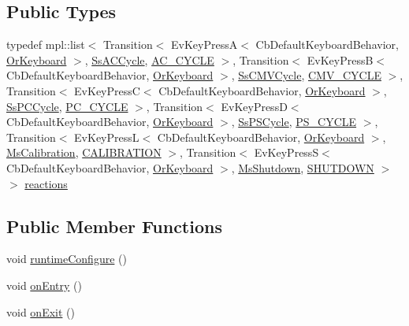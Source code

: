 \subsection*{Public Types}
\begin{DoxyCompactItemize}
\item 
typedef mpl\+::list$<$ Transition$<$ Ev\+Key\+PressA$<$ Cb\+Default\+Keyboard\+Behavior, \hyperlink{classsm__respira__1_1_1OrKeyboard}{Or\+Keyboard} $>$, \hyperlink{structsm__respira__1_1_1SsACCycle}{Ss\+A\+C\+Cycle}, \hyperlink{structsm__respira__1_1_1StObserve_1_1AC__CYCLE}{A\+C\+\_\+\+C\+Y\+C\+LE} $>$, Transition$<$ Ev\+Key\+PressB$<$ Cb\+Default\+Keyboard\+Behavior, \hyperlink{classsm__respira__1_1_1OrKeyboard}{Or\+Keyboard} $>$, \hyperlink{structsm__respira__1_1_1SsCMVCycle}{Ss\+C\+M\+V\+Cycle}, \hyperlink{structsm__respira__1_1_1StObserve_1_1CMV__CYCLE}{C\+M\+V\+\_\+\+C\+Y\+C\+LE} $>$, Transition$<$ Ev\+Key\+PressC$<$ Cb\+Default\+Keyboard\+Behavior, \hyperlink{classsm__respira__1_1_1OrKeyboard}{Or\+Keyboard} $>$, \hyperlink{structsm__respira__1_1_1SsPCCycle}{Ss\+P\+C\+Cycle}, \hyperlink{structsm__respira__1_1_1StObserve_1_1PC__CYCLE}{P\+C\+\_\+\+C\+Y\+C\+LE} $>$, Transition$<$ Ev\+Key\+PressD$<$ Cb\+Default\+Keyboard\+Behavior, \hyperlink{classsm__respira__1_1_1OrKeyboard}{Or\+Keyboard} $>$, \hyperlink{structsm__respira__1_1_1SsPSCycle}{Ss\+P\+S\+Cycle}, \hyperlink{structsm__respira__1_1_1StObserve_1_1PS__CYCLE}{P\+S\+\_\+\+C\+Y\+C\+LE} $>$, Transition$<$ Ev\+Key\+PressL$<$ Cb\+Default\+Keyboard\+Behavior, \hyperlink{classsm__respira__1_1_1OrKeyboard}{Or\+Keyboard} $>$, \hyperlink{classsm__respira__1_1_1MsCalibration}{Ms\+Calibration}, \hyperlink{structsm__respira__1_1_1StObserve_1_1CALIBRATION}{C\+A\+L\+I\+B\+R\+A\+T\+I\+ON} $>$, Transition$<$ Ev\+Key\+PressS$<$ Cb\+Default\+Keyboard\+Behavior, \hyperlink{classsm__respira__1_1_1OrKeyboard}{Or\+Keyboard} $>$, \hyperlink{classsm__respira__1_1_1MsShutdown}{Ms\+Shutdown}, \hyperlink{structsm__respira__1_1_1StObserve_1_1SHUTDOWN}{S\+H\+U\+T\+D\+O\+WN} $>$ $>$ \hyperlink{structsm__respira__1_1_1StObserve_a442d7ab309557e1d6793525d4df07d6d}{reactions}
\end{DoxyCompactItemize}
\subsection*{Public Member Functions}
\begin{DoxyCompactItemize}
\item 
void \hyperlink{structsm__respira__1_1_1StObserve_a3c1fe027b9396233475e8bd94fed6df7}{runtime\+Configure} ()
\item 
void \hyperlink{structsm__respira__1_1_1StObserve_a4aa08a7d0471453573d7ad4f4d6797ed}{on\+Entry} ()
\item 
void \hyperlink{structsm__respira__1_1_1StObserve_a1491b333b722854794cc61e55ff7015a}{on\+Exit} ()
\end{DoxyCompactItemize}

